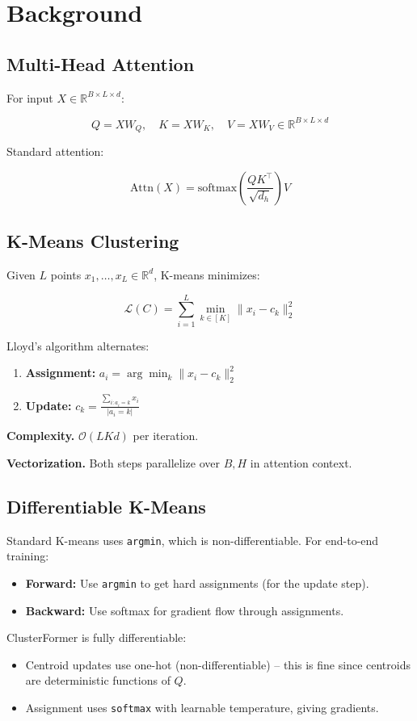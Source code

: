 \section{Background}

\subsection{Multi-Head Attention}

For input $X \in \mathbb{R}^{B \times L \times d}$:

\[
Q = X W_Q, \quad K = X W_K, \quad V = X W_V \in \mathbb{R}^{B \times L \times d}
\]

Standard attention:

\[
\text{Attn}(X) = \text{softmax}\!\left(\frac{Q K^\top}{\sqrt{d_h}}\right) V
\]

\subsection{K-Means Clustering}

Given $L$ points $x_1, \dots, x_L \in \mathbb{R}^d$, K-means minimizes:

\[
\mathcal{L}(C) = \sum_{i=1}^{L} \min_{k \in [K]} \|x_i - c_k\|_2^2
\]

Lloyd's algorithm alternates:

\begin{enumerate}
\item \textbf{Assignment:} $a_i = \arg\min_k \|x_i - c_k\|_2^2$
\item \textbf{Update:} $c_k = \frac{\sum_{i: a_i = k} x_i}{|a_i = k|}$

\end{enumerate}
\textbf{Complexity.} $\mathcal{O}(L K d)$ per iteration.

\textbf{Vectorization.} Both steps parallelize over $B, H$ in attention context.

\subsection{Differentiable K-Means}

Standard K-means uses \texttt{argmin}, which is non-differentiable. For 
end-to-end training:

\begin{itemize}
\item \textbf{Forward:} Use \texttt{argmin} to get hard assignments (for the update step).
\item \textbf{Backward:} Use softmax for gradient flow through assignments.

\end{itemize}
ClusterFormer is fully differentiable:
\begin{itemize}
\item Centroid updates use one-hot (non-differentiable) -- this is fine since
  centroids are deterministic functions of $Q$.
\item Assignment uses \texttt{softmax} with learnable temperature, giving gradients.

\end{itemize}
